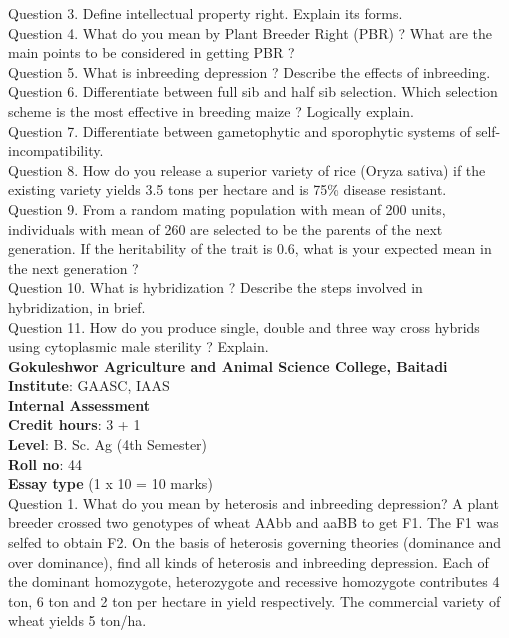 \documentclass[12pt]{article}\usepackage[]{graphicx}\usepackage[]{color}
\begin{document}
Question 3. Define intellectual property right. Explain its forms.\\
Question 4. What do you mean by Plant Breeder Right (PBR) ? What are the main points to be considered in getting PBR ?\\
Question 5. What is inbreeding depression ? Describe the effects of inbreeding.\\
Question 6. Differentiate between full sib and half sib selection. Which selection scheme is the most effective in breeding maize ? Logically explain.\\
Question 7. Differentiate between gametophytic and sporophytic systems of self-incompatibility.\\
Question 8. How do you release a superior variety of rice (Oryza sativa) if the existing variety yields 3.5 tons per hectare and is 75\% disease resistant.\\
Question 9. From a random mating population with mean of 200 units, individuals with mean of 260 are selected to be the parents of the next generation. If the heritability of the trait is 0.6, what is your expected mean in the next generation ?\\
Question 10. What is hybridization ? Describe the steps involved in hybridization, in brief.\\
Question 11. How do you produce single, double and three way cross hybrids using cytoplasmic male sterility ? Explain.\\
\clearpage 
{\centering \Large{\textbf{Gokuleshwor Agriculture and Animal Science College, Baitadi}} \\[0.25cm]
            \textbf{Institute}: GAASC, IAAS \\[0.2cm]
            \textbf{Internal Assessment} \\[0.2cm]} 
\textbf{Credit hours}: 3 + 1 \\ 
\textbf{Level}: B. Sc. Ag (4th Semester) \\
\textbf{Roll no}: 44 \\[0.5cm] 
\textbf{Essay type} (1 x 10 = 10 marks) \\
Question 1. What do you mean by heterosis and inbreeding depression? A plant breeder crossed two genotypes of wheat AAbb and aaBB to get F1. The F1 was selfed to obtain F2. On the basis of heterosis governing theories (dominance and over dominance), find all kinds of heterosis and inbreeding depression. Each of the dominant homozygote, heterozygote and recessive homozygote contributes 4 ton, 6 ton and 2 ton per hectare in yield respectively. The commercial variety of wheat yields 5 ton/ha.\\
\end{document}
